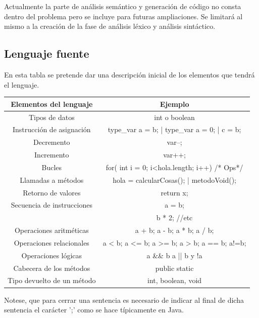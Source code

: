 \documentclass[12pt,a4paper]{article}
\begin{document}
Actualmente la parte de análisis semántico y generación de código no consta dentro del problema pero se incluye para futuras ampliaciones. Se limitará al mismo a la creación de la fase de análisis léxico y análisis sintáctico.

\subsection{Lenguaje fuente}
En esta tabla se pretende dar una descripción inicial de los elementos que tendrá el lenguaje. 
\begin{center}
\begin{tabular}{|c|c|}
	\hline 
	\textbf{Elementos del lenguaje} & \textbf{Ejemplo} \\ 
	\hline 
	Tipos de datos & int o boolean  \\
	\hline 
 	Instrucción de asignación & type\_var a = b; | type\_var a = 0; | c = b; \\
	\hline 
	Decremento & var--; \\ 
	\hline 
	Incremento & var++; \\
	\hline 
	Bucles  &  for( int i = 0; i<hola.length; i++){   /* Ops*/}  \\
	\hline
	Llamadas a métodos & hola = calcularCosas(); | metodoVoid(); \\

	\hline 
 	Retorno de valores &  return x;  \\ 
	\hline  
	Secuencia de instrucciones & a = b; \\
	&  b * 2; //etc \\
	\hline
	Operaciones aritméticas  &  a + b; a - b; a * b; a / b;  \\
	\hline
	Operaciones relacionales & a < b; a <= b; a >= b; a > b; a == b; a!=b;\\
	\hline
	Operaciones lógicas & a \&\& b  a || b y !a \\
	\hline
	Cabecera de los métodos & public static \\
	\hline
	Tipo devuelto de un método & int, boolean, void \\
	\hline
	
\end{tabular} 
\end{center}

Notese, que para cerrar una sentencia es necesario de indicar al final de dicha sentencia el carácter ';' como se hace típicamente en Java.
\end{document}
